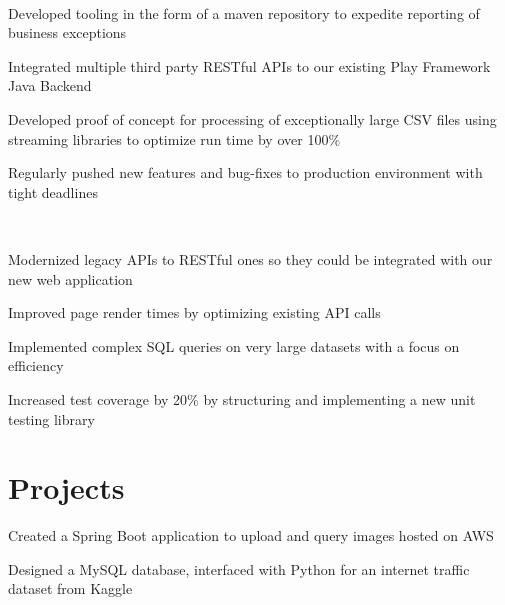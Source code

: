 \documentclass[]{hieudo-build}
\begin{document}
\begin{minipage}[t]{1.0\textwidth}
 \\
\begin{tightemize}
\item Developed tooling in the form of a maven repository to expedite reporting of business exceptions
\item Integrated multiple third party RESTful APIs to our existing Play Framework Java Backend
\item Developed proof of concept for processing of exceptionally large CSV files using streaming libraries to optimize run time by over 100\% 
\item Regularly pushed new features and bug-fixes to production environment with tight deadlines
\end{tightemize}
\sectionsep

 \\
\begin{tightemize}
\item Modernized legacy APIs to RESTful ones so they could be integrated with our new web application
\item Improved page render times by optimizing existing API calls
\item Implemented complex SQL queries on very large datasets with a focus on efficiency 
\item  Increased test coverage by 20\% by structuring and implementing a new unit testing library
\end{tightemize}
\sectionsep



\section{Projects}

\descript{}
Created a Spring Boot application to upload and query images hosted on AWS
\sectionsep

\descript{}
Designed a MySQL database, interfaced with Python for an internet traffic dataset from Kaggle
\sectionsep


\end{minipage}
\end{document}

